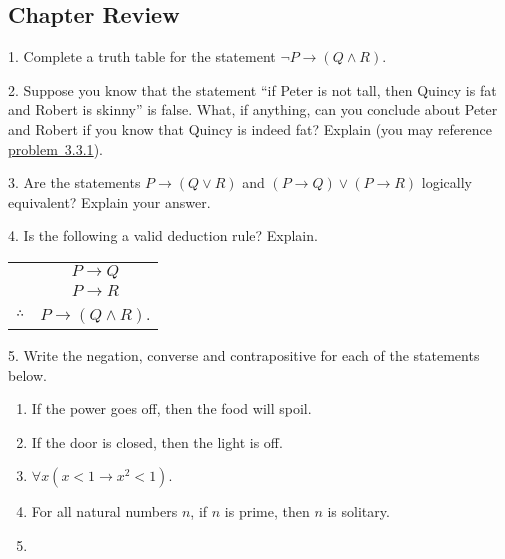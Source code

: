 \documentclass[10pt,]{book}
\theoremstyle{plain}
\theoremstyle{definition}
\numberwithin{equation}{chapter}
\newcommand{\hrulethin}  {\noalign{\hrule height 0.04em}}
\def\imp{\rightarrow}
\newcommand{\lt}{ < }
\begin{document}
\subsection[Chapter Review]{Chapter Review}\label{exercises_logic-conc}
\begin{exerciselist}
\item[1.]\hypertarget{tt}{}
        Complete a truth table for the statement \(\neg P \imp (Q \wedge R)\).
\par\smallskip
\item[2.]\hypertarget{exercise-263}{}
        Suppose you know that the statement ``if Peter is not tall, then Quincy is fat and Robert is skinny'' is false. What, if anything, can you conclude about Peter and Robert if you know that Quincy is indeed fat? Explain (you may reference
        \hyperlink{tt}{problem~3.3.1}).
\par\smallskip
\item[3.]\hypertarget{exercise-264}{}
        Are the statements \(P \imp (Q \vee R)\) and \((P \imp Q) \vee (P \imp R)\) logically equivalent? Explain your answer.
\par\smallskip
\item[4.]\hypertarget{exercise-265}{}
        Is the following a valid deduction rule? Explain.
\leavevmode%
\begin{table}
\centering
\begin{tabular}{cc}
&\(P \imp Q\)\tabularnewline[0pt]
&\(P\imp R\)\tabularnewline\hrulethin
\(\therefore\)&\(P \imp (Q \wedge R)\).
\end{tabular}
\end{table}
\par\smallskip
\item[5.]\hypertarget{exercise-266}{}
        Write the negation, converse and contrapositive for each of the statements below.
\leavevmode%
\begin{enumerate}[label=(\alph*)]
\item\hypertarget{li-703}{}
            If the power goes off, then the food will spoil.
\item\hypertarget{li-704}{}
            If the door is closed, then the light is off.
\item\hypertarget{li-705}{}\(\forall x (x \lt  1 \imp x^2 \lt  1)\).%
\item\hypertarget{li-706}{}
            For all natural numbers \(n\), if \(n\) is prime, then \(n\) is solitary.
\item\hypertarget{li-707}{}

\end{enumerate}
\end{exerciselist}
\end{document}
